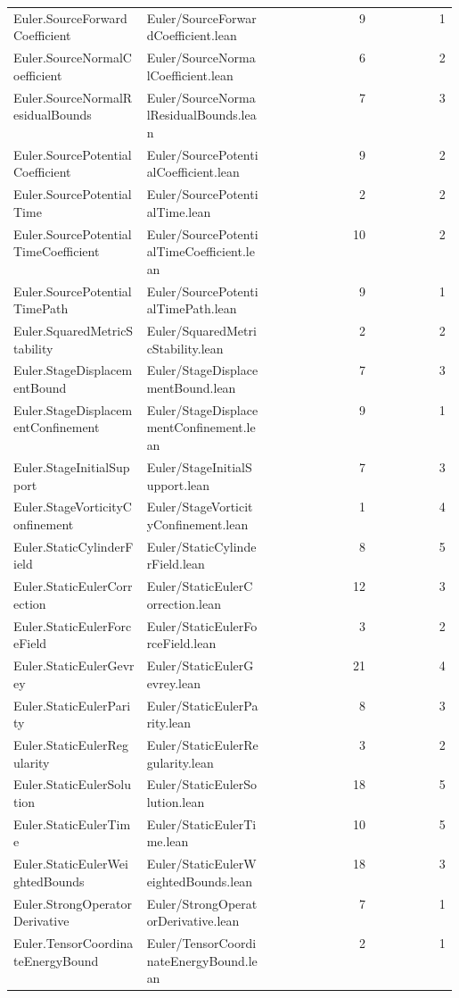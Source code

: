 \begin{longtable}{p{0.30\linewidth}p{0.28\linewidth}rr}
Euler.SourceForwardCoefficient & Euler/SourceForwardCoefficient.lean & 9 & 1\\
Euler.SourceNormalCoefficient & Euler/SourceNormalCoefficient.lean & 6 & 2\\
Euler.SourceNormalResidualBounds & Euler/SourceNormalResidualBounds.lean & 7 & 3\\
Euler.SourcePotentialCoefficient & Euler/SourcePotentialCoefficient.lean & 9 & 2\\
Euler.SourcePotentialTime & Euler/SourcePotentialTime.lean & 2 & 2\\
Euler.SourcePotentialTimeCoefficient & Euler/SourcePotentialTimeCoefficient.lean & 10 & 2\\
Euler.SourcePotentialTimePath & Euler/SourcePotentialTimePath.lean & 9 & 1\\
Euler.SquaredMetricStability & Euler/SquaredMetricStability.lean & 2 & 2\\
Euler.StageDisplacementBound & Euler/StageDisplacementBound.lean & 7 & 3\\
Euler.StageDisplacementConfinement & Euler/StageDisplacementConfinement.lean & 9 & 1\\
Euler.StageInitialSupport & Euler/StageInitialSupport.lean & 7 & 3\\
Euler.StageVorticityConfinement & Euler/StageVorticityConfinement.lean & 1 & 4\\
Euler.StaticCylinderField & Euler/StaticCylinderField.lean & 8 & 5\\
Euler.StaticEulerCorrection & Euler/StaticEulerCorrection.lean & 12 & 3\\
Euler.StaticEulerForceField & Euler/StaticEulerForceField.lean & 3 & 2\\
Euler.StaticEulerGevrey & Euler/StaticEulerGevrey.lean & 21 & 4\\
Euler.StaticEulerParity & Euler/StaticEulerParity.lean & 8 & 3\\
Euler.StaticEulerRegularity & Euler/StaticEulerRegularity.lean & 3 & 2\\
Euler.StaticEulerSolution & Euler/StaticEulerSolution.lean & 18 & 5\\
Euler.StaticEulerTime & Euler/StaticEulerTime.lean & 10 & 5\\
Euler.StaticEulerWeightedBounds & Euler/StaticEulerWeightedBounds.lean & 18 & 3\\
Euler.StrongOperatorDerivative & Euler/StrongOperatorDerivative.lean & 7 & 1\\
Euler.TensorCoordinateEnergyBound & Euler/TensorCoordinateEnergyBound.lean & 2 & 1\\

\end{longtable}
